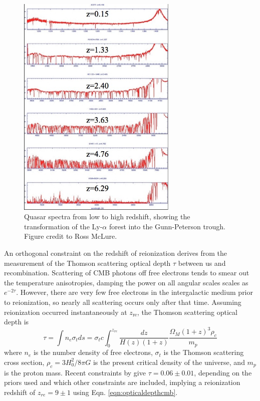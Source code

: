 \begin{figure}
	\centering
	\includegraphics[width=3in]{chap0_intro/lymanalpha_diffz.jpg}
	\caption[Quasar spectra from low to high redshift, showing the transformation of the Ly-$\alpha$ forest into the Gunn-Peterson trough.]{Quasar spectra from low to high redshift, showing the transformation of the Ly-$\alpha$ forest into the Gunn-Peterson trough. Figure credit to Ross McLure.}
	\label{fig:lya}
\end{figure}

An orthogonal constraint on the redshift of reionization derives from the measurement of the Thomson scattering optical depth $\tau$ between us and recombination. Scattering of CMB photons off free electrons tends to smear out the temperature anisotropies, damping the power on all angular scales scales as $e^{-2\tau}$. However, there are very few free electrons in the intergalactic medium prior to reionization, so nearly all scattering occurs only after that time.  Assuming reionization occurred instantaneously at $z_\text{re}$, the Thomson scattering optical depth is 
\begin{equation}
\label{eqn:opticaldepthcmb}
	\tau=\int n_e\sigma_t ds=\sigma_t c\int_0^{z_{re}}\frac{dz}{H(z)(1+z)}\frac{\Omega_M(1+z)^3\rho_c}{m_p}
\end{equation}
where $n_e$ is the number density of free electrons, $\sigma_t$ is the Thomson scattering cross section, $\rho_c=3H_0^2/8\pi G$ is the present critical density of the universe, and $m_p$ is the proton mass. Recent constraints by \citep{plancktau16} give  $\tau=0.06\pm0.01$, depending on the priors used and which other constraints are included, implying a reionization redshift of $z_{re}=9\pm1$ using Eqn. \ref{eqn:opticaldepthcmb}.

